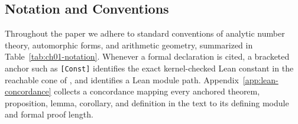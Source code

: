 \subsection{Notation and Conventions}
\label{subsec:ch01-notation}

Throughout the paper we adhere to standard conventions of analytic number
theory, automorphic forms, and arithmetic geometry, summarized in
Table~\ref{tab:ch01-notation}.
Whenever a formal declaration is cited, a bracketed anchor such as
\texttt{[Const]} identifies the exact kernel-checked Lean constant in the
reachable cone of , and  identifies a Lean
module path.
Appendix~\ref{app:lean-concordance} collects a concordance mapping every
anchored theorem, proposition, lemma, corollary, and definition in the text to
its defining module and formal proof length.

